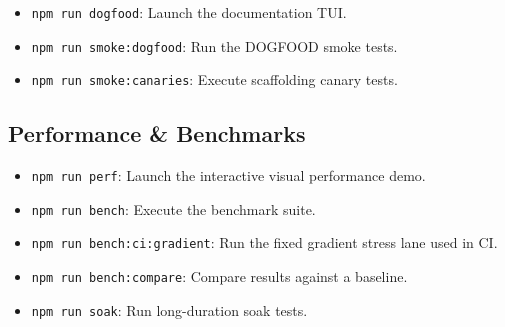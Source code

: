 \begin{itemize}
\tightlist
\item
  \texttt{n\allowbreak{}p\allowbreak{}m\allowbreak{} \allowbreak{}r\allowbreak{}u\allowbreak{}n\allowbreak{} \allowbreak{}d\allowbreak{}o\allowbreak{}g\allowbreak{}f\allowbreak{}o\allowbreak{}o\allowbreak{}d}: Launch the documentation TUI.
\item
  \texttt{n\allowbreak{}p\allowbreak{}m\allowbreak{} \allowbreak{}r\allowbreak{}u\allowbreak{}n\allowbreak{} \allowbreak{}s\allowbreak{}m\allowbreak{}o\allowbreak{}k\allowbreak{}e\allowbreak{}:\allowbreak{}d\allowbreak{}o\allowbreak{}g\allowbreak{}f\allowbreak{}o\allowbreak{}o\allowbreak{}d}: Run the DOGFOOD smoke tests.
\item
  \texttt{n\allowbreak{}p\allowbreak{}m\allowbreak{} \allowbreak{}r\allowbreak{}u\allowbreak{}n\allowbreak{} \allowbreak{}s\allowbreak{}m\allowbreak{}o\allowbreak{}k\allowbreak{}e\allowbreak{}:\allowbreak{}c\allowbreak{}a\allowbreak{}n\allowbreak{}a\allowbreak{}r\allowbreak{}i\allowbreak{}e\allowbreak{}s}: Execute scaffolding canary tests.
\end{itemize}

\subsection{Performance \& Benchmarks}\label{record-004-performance-benchmarks}

\begin{itemize}
\tightlist
\item
  \texttt{n\allowbreak{}p\allowbreak{}m\allowbreak{} \allowbreak{}r\allowbreak{}u\allowbreak{}n\allowbreak{} \allowbreak{}p\allowbreak{}e\allowbreak{}r\allowbreak{}f}: Launch the interactive visual performance demo.
\item
  \texttt{n\allowbreak{}p\allowbreak{}m\allowbreak{} \allowbreak{}r\allowbreak{}u\allowbreak{}n\allowbreak{} \allowbreak{}b\allowbreak{}e\allowbreak{}n\allowbreak{}c\allowbreak{}h}: Execute the benchmark suite.
\item
  \texttt{n\allowbreak{}p\allowbreak{}m\allowbreak{} \allowbreak{}r\allowbreak{}u\allowbreak{}n\allowbreak{} \allowbreak{}b\allowbreak{}e\allowbreak{}n\allowbreak{}c\allowbreak{}h\allowbreak{}:\allowbreak{}c\allowbreak{}i\allowbreak{}:\allowbreak{}g\allowbreak{}r\allowbreak{}a\allowbreak{}d\allowbreak{}i\allowbreak{}e\allowbreak{}n\allowbreak{}t}: Run the fixed gradient stress lane used in CI.
\item
  \texttt{n\allowbreak{}p\allowbreak{}m\allowbreak{} \allowbreak{}r\allowbreak{}u\allowbreak{}n\allowbreak{} \allowbreak{}b\allowbreak{}e\allowbreak{}n\allowbreak{}c\allowbreak{}h\allowbreak{}:\allowbreak{}c\allowbreak{}o\allowbreak{}m\allowbreak{}p\allowbreak{}a\allowbreak{}r\allowbreak{}e}: Compare results against a baseline.
\item
  \texttt{n\allowbreak{}p\allowbreak{}m\allowbreak{} \allowbreak{}r\allowbreak{}u\allowbreak{}n\allowbreak{} \allowbreak{}s\allowbreak{}o\allowbreak{}a\allowbreak{}k}: Run long-duration soak tests.
\end{itemize}

